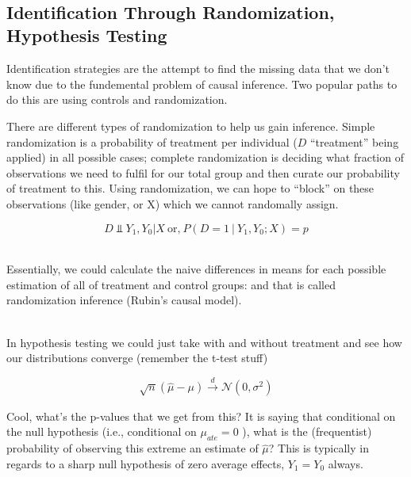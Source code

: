 \documentclass[12pt]{article}\usepackage[]{graphicx}\usepackage[]{color}
\begin{document}
\begin{flushleft}
\hfill \\

\subsection{Identification Through Randomization, Hypothesis Testing}

Identification strategies are the attempt to find the missing data that we don't know due to the fundemental problem of causal inference. Two popular paths to do this are using controls and randomization.

There are different types of randomization to help us gain inference. Simple randomization is a probability of treatment per individual ($D$ ``treatment'' being applied) in all possible cases; complete randomization is deciding what fraction of observations we need to fulfil for our total group and then curate our probability of treatment to this. Using randomization, we can hope to ``block'' on these observations (like gender, or X) which we cannot randomally assign.

\begin{equation}
D \Vbar Y_1, Y_0 | X ~ \text{or,} ~ P(D=1 ~ | ~ Y_1, Y_0; X) = p
\end{equation}

\hfill \\

Essentially, we could calculate the naive differences in means for each possible estimation of all of treatment and control groups: and that is called randomization inference (Rubin's causal model).


\hfill \\

In hypothesis testing we could just take with and without treatment and see how our distributions converge (remember the t-test stuff)

\begin{equation}
\sqrt{n}(\hat{\mu} - \mu) \xrightarrow[]{d} \mathcal{N}(0, \sigma^2)
\end{equation}

Cool, what's the p-values that we get from this? It is saying that conditional on the null hypothesis (i.e., conditional on $\mu_{ate} = 0$ ), what is the (frequentist) probability of observing this extreme an estimate of $\hat{\mu}$? This is typically in regards to a sharp null hypothesis of zero average effects, $Y_1 = Y_0$ always. 


\end{flushleft}
\end{document}
